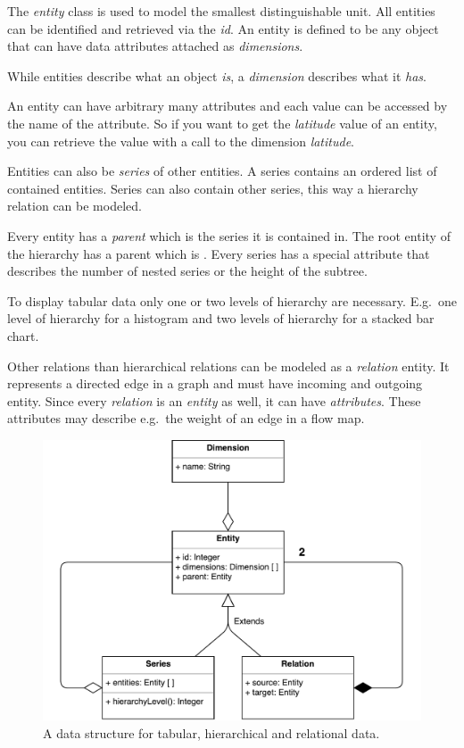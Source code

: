 The \emph{entity} class is used to model the smallest distinguishable unit.
All entities can be identified and retrieved via the \emph{id}.
An entity is defined to be any object that can have data attributes attached as \emph{dimensions}.

While entities describe what an object \emph{is}, a \emph{dimension} describes what it \emph{has}.

An entity can have arbitrary many attributes and each value can be accessed by the name of the attribute.
So if you want to get the \emph{latitude} value of an entity, you can retrieve the value with a call to the dimension \emph{latitude}.

Entities can also be \emph{series} of other entities.
A series contains an ordered list of contained entities.
Series can also contain other series, this way a hierarchy relation can be modeled.

Every entity has a \emph{parent} which is the series it is contained in.
The root entity of the hierarchy has a parent which is .
Every series has a special attribute  that describes the number of nested series or the height of the subtree.

To display tabular data only one or two levels of hierarchy are necessary.
E.g.\ one level of hierarchy for a histogram and two levels of hierarchy for a stacked bar chart.

Other relations than hierarchical relations can be modeled as a \emph{relation} entity.
It represents a directed edge in a graph and must have incoming and outgoing entity.
Since every \emph{relation} is an \emph{entity} as well, it can have \emph{attributes}.
These attributes may describe e.g.\ the weight of an edge in a flow map.

\begin{figure}[ht]
  \centering
  \includegraphics[width=\textwidth]{figures/concept/DataModel}
  \caption{%
    A data structure for tabular, hierarchical and relational data.
  }\label{fig:concept:shared-data-model}
\end{figure}



